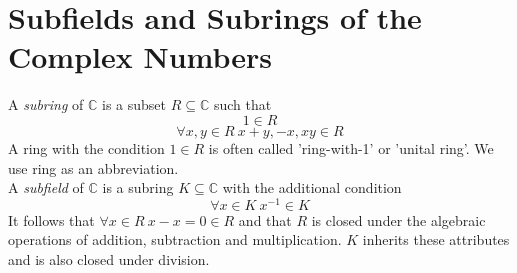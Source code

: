 \section{Subfields and Subrings of the Complex Numbers}
\begin{definition}
    A \textit{subring} of $\mathbb{C}$ is a subset $R \subseteq \mathbb{C}$ such that
    \[1 \in R\]
    \[\forall x,y \in R \ x + y,-x,xy \in R\]
    A ring with the condition $1 \in R$ is often called 'ring-with-1' or 'unital ring'.
    We use ring as an abbreviation.\\
    A \textit{subfield} of $\mathbb{C}$ is a subring $K \subseteq \mathbb{C}$
    with the additional condition
    \[\forall x \in K \ x^{-1} \in K\]
    It follows that $\forall x \in R \ x - x = 0 \in R$
    and that $R$ is closed under the algebraic operations of addition, subtraction and multiplication.
    $K$ inherits these attributes and is also closed under division.
\end{definition}

